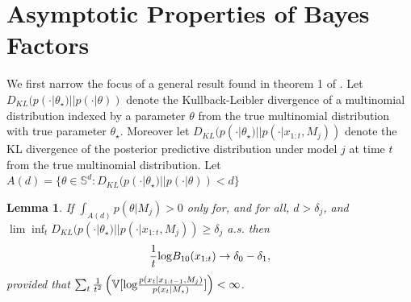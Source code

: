 \documentclass[11pt]{article}
\def\log{{\rm log}}
\newtheorem{lemma}{Lemma}[section]
\begin{document}
\section{Asymptotic Properties of Bayes Factors}
\label{app:asymptotics}
We first narrow the focus of a general result found in theorem 1 of \cite{walker}. Let $D_{KL}(p(\cdot|\theta_\star)||p(\cdot|\theta) )$ denote the Kullback-Leibler divergence of a multinomial distribution indexed by a parameter $\theta$ from the true multinomial distribution with true parameter $\theta_{\star}$. Moreover let $D_{KL}(p(\cdot|\theta_\star)||p(\cdot|x_{1:t}, M_j) )$ denote the KL divergence of the posterior predictive distribution under model $j$ at time $t$ from the true multinomial distribution. Let $A(d) = \lbrace \theta \in \mathbb{S}^d : D_{KL}(p(\cdot|\theta_\star)||p(\cdot|\theta) ) < d \rbrace$
\begin{lemma}
  \label{lemma:walker}
  If $\int_{A(d)} p(\theta|M_j) > 0$ only for, and for all, $d > \delta_j$, and $\lim \inf_t D_{KL}(p(\cdot|\theta_\star)||p(\cdot|x_{1:t}, M_j) ) \geq \delta_j$ a.s. then
  \begin{equation}
    \label{eq:bayes_factor_convergence}
    \frac{1}{t} \log B_{10}(x_{1:t}) \rightarrow \delta_0 - \delta_1,
  \end{equation}
  provided that $\sum_t \frac{1}{t^2} \left( \mathbb{V}[\log \frac{p(x_t|x_{1:t-1},M_j)}{p(x_t|M_\star )}]\right) < \infty$.
\end{lemma}
\end{document}
